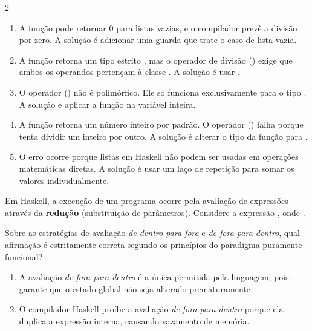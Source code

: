 \documentclass[a4paper,10pt,brazil]{article}
\begin{document}
\begin{multicols}{2}
\begin{enumerate}
  \item A função  pode retornar 0 para listas vazias, e o compilador prevê a divisão por zero. A solução é adicionar uma guarda que trate o caso de lista vazia.

  \item A função  retorna um tipo estrito , mas o operador de divisão (\haskellinline{/}) exige que ambos os operandos pertençam à classe . A solução é usar .

  \item O operador (\haskellinline{/}) não é polimórfico. Ele só funciona exclusivamente para o tipo . A solução é aplicar a função  na variável  inteira.

  \item A função  retorna um número inteiro por padrão. O operador (\haskellinline{/}) falha porque tenta dividir um inteiro por outro. A solução é alterar o tipo da função para .

  \item O erro ocorre porque listas em Haskell não podem ser usadas em operações matemáticas diretas. A solução é usar um laço de repetição  para somar os valores individualmente.


\end{enumerate}

Em Haskell, a execução de um programa ocorre pela avaliação de expressões através da \textbf{redução} (substituição de parâmetros). Considere a expressão , onde . 

Sobre as estratégias de avaliação \emph{de dentro para fora} e \emph{de fora para dentro}, qual afirmação é estritamente correta segundo os princípios do paradigma puramente funcional?

\begin{enumerate}
  \item A avaliação \emph{de fora para dentro} é a única permitida pela linguagem, pois garante que o estado global não seja alterado prematuramente.

  \item O compilador Haskell proíbe a avaliação \emph{de fora para dentro} porque ela duplica a expressão interna, causando vazamento de memória.


\end{enumerate}
\end{multicols}
\end{document}
